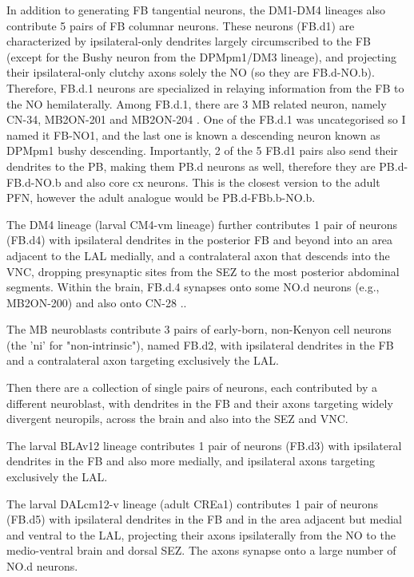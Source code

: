             In addition to generating FB tangential neurons, the DM1-DM4 lineages also contribute 5 pairs of FB columnar neurons. These neurons (FB.d1) are characterized by ipsilateral-only dendrites largely circumscribed to the FB (except for the Bushy neuron from the DPMpm1/DM3 lineage), and projecting their ipsilateral-only clutchy axons solely the NO (so they are FB.d-NO.b). Therefore, FB.d.1 neurons are specialized in relaying information from the FB to the NO hemilaterally. Among FB.d.1, there are 3 MB related neuron, namely CN-34, MB2ON-201 and MB2ON-204  \citep{eschbach2021circuits}. One of the FB.d.1 was uncategorised so I named it FB-NO1, and the last one is known a descending neuron known as DPMpm1 bushy descending. 
            Importantly, 2 of the 5 FB.d1 pairs also send their dendrites to the PB, making them PB.d neurons as well, therefore they are PB.d-FB.d-NO.b and also core cx neurons. This is the closest version to the adult PFN, however the adult analogue would be PB.d-FBb.b-NO.b. %

            The DM4 lineage (larval CM4-vm lineage) further contributes 1 pair of neurons (FB.d4) with ipsilateral dendrites in the posterior FB and beyond into an area adjacent to the LAL medially, and a contralateral axon that descends into the VNC, dropping presynaptic sites from the SEZ to the most posterior abdominal segments. Within the brain, FB.d.4 synapses onto some NO.d neurons (e.g., MB2ON-200) and also onto CN-28 \citep{eschbach2021circuits}..

            The MB neuroblasts contribute 3 pairs of early-born, non-Kenyon cell neurons (the 'ni' for "non-intrinsic"), named FB.d2, with ipsilateral dendrites in the FB and a contralateral axon targeting exclusively the LAL.

            Then there are a collection of single pairs of neurons, each contributed by a different neuroblast, with dendrites in the FB and their axons targeting widely divergent neuropils, across the brain and also into the SEZ and VNC.

            The larval BLAv12 lineage contributes 1 pair of neurons (FB.d3) with ipsilateral dendrites in the FB and also more medially, and ipsilateral axons targeting exclusively the LAL.

            The larval DALcm12-v lineage (adult CREa1) contributes 1 pair of neurons (FB.d5) with ipsilateral dendrites in the FB and in the area adjacent but medial and ventral to the LAL, projecting their axons ipsilaterally from the NO to the medio-ventral brain and dorsal SEZ. The axons synapse onto a large number of NO.d neurons.

